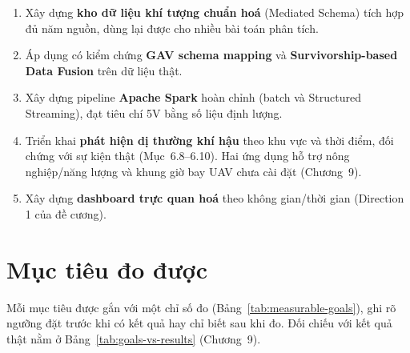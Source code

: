 \documentclass[12pt,a4paper]{report}
\begin{document}
\begin{enumerate}
    \item Xây dựng \textbf{kho dữ liệu khí tượng chuẩn hoá} (Mediated Schema) tích hợp đủ năm nguồn, dùng
    lại được cho nhiều bài toán phân tích.
    \item Áp dụng có kiểm chứng \textbf{GAV schema mapping} và \textbf{Survivorship-based Data Fusion} trên
    dữ liệu thật.
    \item Xây dựng pipeline \textbf{Apache Spark} hoàn chỉnh (batch và Structured Streaming), đạt tiêu chí
    5V bằng số liệu định lượng.
    \item Triển khai \textbf{phát hiện dị thường khí hậu} theo khu vực và thời điểm, đối chứng với sự kiện
    thật (Mục~6.8--6.10). Hai ứng dụng hỗ trợ nông nghiệp/năng lượng và khung giờ bay UAV chưa cài đặt
    (Chương~9).
    \item Xây dựng \textbf{dashboard trực quan hoá} theo không gian/thời gian (Direction 1 của đề cương).
\end{enumerate}

\section{Mục tiêu đo được}

Mỗi mục tiêu được gắn với một chỉ số đo (Bảng~\ref{tab:measurable-goals}), ghi rõ ngưỡng đặt trước
khi có kết quả hay chỉ biết sau khi đo. Đối chiếu với kết quả thật nằm ở Bảng~\ref{tab:goals-vs-results}
(Chương~9).
\end{document}
